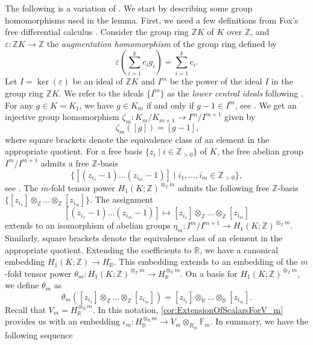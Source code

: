 \documentclass{amsart}
\begin{document}
The following is a variation of \cite[Lemma 3.1]{CaiClayRolfsen}. We start by describing some group homomorphisms used in the lemma. First, we need a few definitions from Fox's free differential calculus \cite{fox1953freedifferentialcalculus}. Consider the group ring $\mathbb{Z} K$ of $K$ over $\mathbb{Z}$, and $\varepsilon:\mathbb{Z}K \to \mathbb{Z}$ the \emph{augmentation homomorphism} of the group ring defined by  
\[
\varepsilon\left(\sum_{i=1}^k c_i g_i \right) = \sum_{i=1}^k c_i.
\]
Let $I = \ker(\varepsilon)$ be an ideal of $\mathbb{Z} K$ and $I^m$ be the power of the ideal $I$ in the group ring $\mathbb{Z}K$. We refer to the ideals $\{I^m\}$ as the \emph{lower central ideals} following \cite{fox1953freedifferentialcalculus}. For any $g \in K = K_1$, we have $g \in K_m$ if and only if $g-1 \in I^m$, see \cite[Proposition 4.6]{fox1953freedifferentialcalculus}. We get an injective group homomorphism $\zeta_m: K_m /K_{m+1} \to I^m /I^{m+1}$ given by 
\[\
\zeta_m([g]) = [g-1],
\] 
where square brackets denote the equivalence class of an element in the appropriate quotient. For a free basis $\{z_i \mid i \in \mathbb{Z}_{>0}\}$ of $K$, the free abelian group $I^m /I^{m+1}$ admits a free $\mathbb{Z}$-basis 
\begin{equation}
\label{eq:FreeZBasisForLowerCentralQuotient}
    \{[(z_{i_1}-1)\dots (z_{i_m}-1)] \mid i_1,\dots,i_m \in \mathbb{Z}_{>0}\},
\end{equation} 
see \cite[Proposition 4.7]{fox1953freedifferentialcalculus}. The $m$-fold tensor power $H_1(K;\mathbb{Z})^{\otimes_\mathbb{Z} m }$ admits the following free $\mathbb{Z}$-basis $\{[z_{i_1}] \otimes_{\mathbb{Z}}\dots\otimes_{\mathbb{Z}}[ z_{i_m}]\}$. The assignment 
\[
[(z_{i_1}-1)\dots (z_{i_m}-1)] \mapsto [z_{i_1}] \otimes_{\mathbb{Z}} \dots \otimes_{\mathbb{Z}} [z_{i_m}]
\]
extends to an isomorphism of abelian groups $\eta_m:I^m/I^{m+1} \to H_1(K;\mathbb{Z})^{\otimes_\mathbb{Z} m }$. Similarly, square brackets denote the equivalence class of an element in the appropriate quotient. Extending the coefficients to $\mathbb{R}$, we have a canonical embedding $H_1(K;\mathbb{Z}) \to H_\mathbb{R}$. This embedding extends to an embedding of the $m$-fold tensor power $\theta_m: H_1(K;\mathbb{Z})^{\otimes_{\mathbb{Z}} m}\to H_\mathbb{R} ^{\otimes_{\mathbb{R}} m}$. On a basis for $H_1(K;\mathbb{Z})^{\otimes_{\mathbb{Z}} m}$, we define $\theta_m$ as
\[
\theta_m([z_{i_1}] \otimes_{\mathbb{Z}} \dots \otimes_{\mathbb{Z}} [z_{i_m}]) = [z_{i_1}] \otimes_{\mathbb{R}} \dots \otimes_{\mathbb{R}} [z_{i_m}].
\]
Recall that $V_m = H_\mathbb{R}^{\otimes_{\mathbb{R}} m}$. In this notation, \cref{cor:ExtensionOfScalarsForV_m} provides us with an embedding $\iota_m: H_\mathbb{R}^{\otimes_{\mathbb{R}} m } \to V_m \otimes_{R_m} \mathbb{F}_m$. In summary, we have the following sequence  
\end{document}
